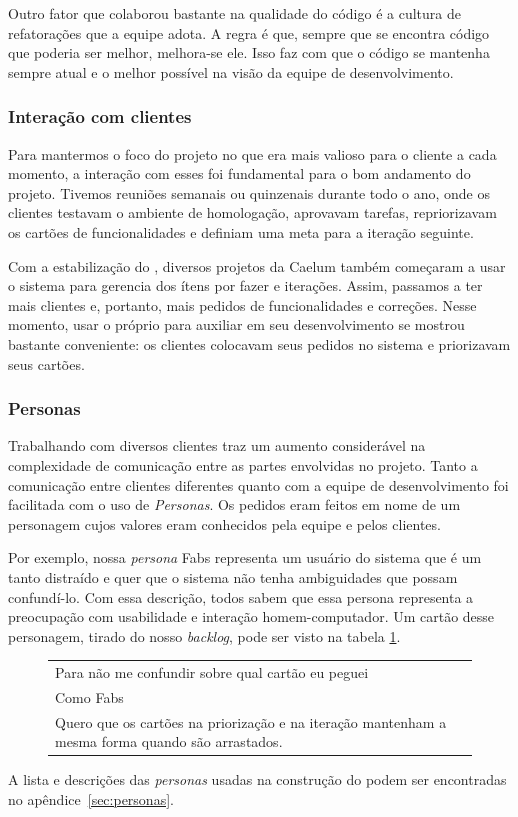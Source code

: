Outro fator que colaborou bastante na qualidade do código é a cultura de refatorações que a equipe adota. A regra é que, sempre que se encontra código que poderia ser melhor, melhora-se ele. Isso faz com que o código se mantenha sempre atual e o melhor possível na visão da equipe de desenvolvimento.

\subsubsection*{Interação com clientes}

Para mantermos o foco do projeto no que era mais valioso para o cliente a cada momento, a interação com esses foi fundamental para o bom andamento do projeto. Tivemos reuniões semanais ou quinzenais durante todo o ano, onde os clientes testavam o \calopsita{} ambiente de homologação, aprovavam tarefas,  repriorizavam os cartões de funcionalidades e definiam uma meta para a iteração seguinte. 

Com a estabilização do \calopsita{}, diversos projetos da Caelum também começaram a usar o sistema para gerencia dos ítens por fazer e iterações. Assim, passamos a ter mais clientes e, portanto, mais pedidos de funcionalidades e correções. Nesse momento, usar o próprio \calopsita{} para auxiliar em seu desenvolvimento se mostrou bastante conveniente: os clientes colocavam seus pedidos no sistema e priorizavam seus cartões.

\subsubsection*{Personas}

Trabalhando com diversos clientes traz um aumento considerável na complexidade de comunicação entre as partes envolvidas no projeto. Tanto a comunicação entre clientes diferentes quanto com a equipe de desenvolvimento foi facilitada com o uso de \textit{Personas}. Os pedidos eram feitos em nome de um personagem cujos valores eram conhecidos pela equipe e pelos clientes. 

Por exemplo, nossa \textit{persona} Fabs representa um usuário do sistema que é um tanto distraído e quer que o sistema não tenha ambiguidades que possam confundí-lo. Com essa descrição, todos sabem que essa persona representa a preocupação com usabilidade e interação homem-computador. Um cartão desse personagem, tirado do nosso \textit{backlog}, pode ser visto na tabela \ref{tabela:fabs}.

\begin{figure}[H]
  \label{tabela:fabs}
  \begin{tabular}{|p{10cm}|}
    \hline
    Para não me confundir sobre qual cartão eu peguei \\
    Como Fabs \\
    Quero que os cartões na priorização e na iteração mantenham a mesma forma quando são arrastados. \\
    \hline
  \end{tabular}
\end{figure}

A lista e descrições das \textit{personas} usadas na construção do \calopsita{} podem ser encontradas no apêndice~\ref{sec:personas}.
